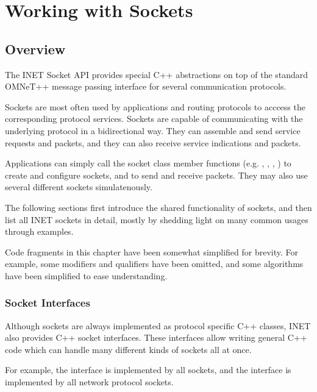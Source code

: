 \chapter{Working with Sockets}
\label{cha:sockets}

\section{Overview}
\label{sec:sockets:overview}

The INET Socket API provides special C++ abstractions on top of the standard
OMNeT++ message passing interface for several communication protocols.

Sockets are most often used by applications and routing protocols to acccess the
corresponding protocol services. Sockets are capable of communicating with the
underlying protocol in a bidirectional way. They can assemble and send service
requests and packets, and they can also receive service indications and packets.

Applications can simply call the socket class member functions (e.g.
, , , ) to create
and configure sockets, and to send and receive packets. They may also use
several different sockets simulatenously.

The following sections first introduce the shared functionality of sockets, and
then list all INET sockets in detail, mostly by shedding light on many common
usages through examples.

\begin{note}
Code fragments in this chapter have been somewhat simplified for brevity. For
example, some  modifiers and  qualifiers have been
omitted, and some algorithms have been simplified to ease understanding.
\end{note}

\subsection*{Socket Interfaces}

Although sockets are always implemented as protocol specific C++ classes, INET
also provides C++ socket interfaces. These interfaces allow writing general C++
code which can handle many different kinds of sockets all at once.

For example, the  interface is implemented by all sockets, and
the  interface is implemented by all network protocol
sockets.

